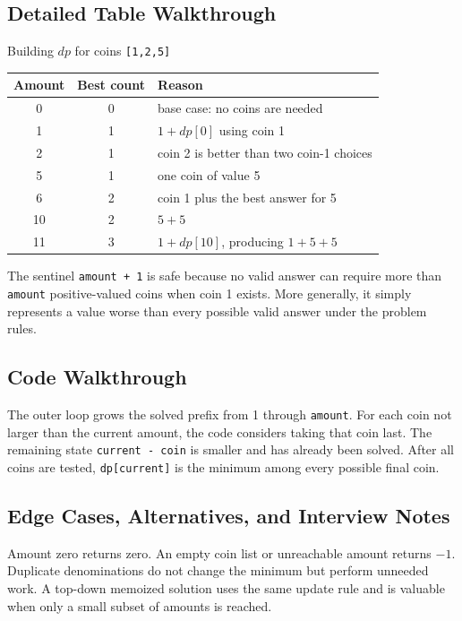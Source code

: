 \subsection{Detailed Table Walkthrough}
\begin{dryrunbox}{Building \(dp\) for coins \texttt{[1,2,5]}}
\begin{center}
\begin{tabularx}{\linewidth}{@{}c c X@{}}
\toprule
Amount & Best count & Reason \\
\midrule
0 & 0 & base case: no coins are needed \\
1 & 1 & \(1+dp[0]\) using coin 1 \\
2 & 1 & coin 2 is better than two coin-1 choices \\
5 & 1 & one coin of value 5 \\
6 & 2 & coin 1 plus the best answer for 5 \\
10 & 2 & \(5+5\) \\
11 & 3 & \(1+dp[10]\), producing \(1+5+5\) \\
\bottomrule
\end{tabularx}
\end{center}
\end{dryrunbox}

The sentinel \texttt{amount + 1} is safe because no valid answer can require
more than \texttt{amount} positive-valued coins when coin 1 exists. More
generally, it simply represents a value worse than every possible valid
answer under the problem rules.

\subsection{Code Walkthrough}
The outer loop grows the solved prefix from 1 through \texttt{amount}. For
each coin not larger than the current amount, the code considers taking that
coin last. The remaining state \texttt{current - coin} is smaller and has
already been solved. After all coins are tested, \texttt{dp[current]} is the
minimum among every possible final coin.

\subsection{Edge Cases, Alternatives, and Interview Notes}
Amount zero returns zero. An empty coin list or unreachable amount returns
\(-1\). Duplicate denominations do not change the minimum but perform
unneeded work. A top-down memoized solution uses the same update rule and
is valuable when only a small subset of amounts is reached.

